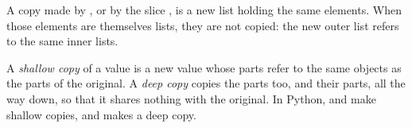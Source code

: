 A copy made by , or by the slice , is a new list holding the same elements. When those
elements are themselves lists, they are not copied: the new outer list refers to the same inner lists.

\begin{definition}\label{def:g10:tuples-sets-comprehensions:copy}
A \emph{shallow copy} of a value is a new value whose parts refer to the same objects as the
parts of the original. A \emph{deep copy} copies the parts too, and their parts, all the way down,
so that it shares nothing  with the original. In Python,  and  make shallow copies,
and  makes a deep copy.
\end{definition}

\label{lst:g10:tuples-sets-comprehensions:copy-nested}

\label{out:g10:tuples-sets-comprehensions:copy-nested}

